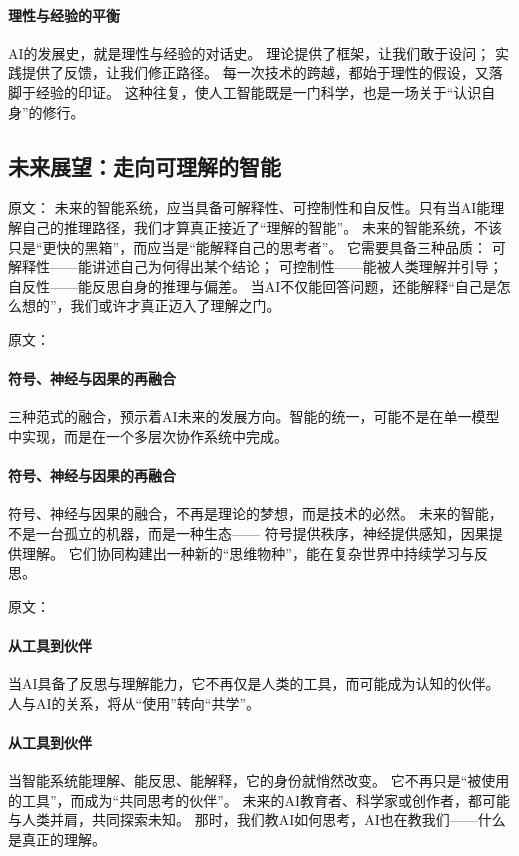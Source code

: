 \paragraph{理性与经验的平衡}
AI的发展史，就是理性与经验的对话史。  
理论提供了框架，让我们敢于设问；  
实践提供了反馈，让我们修正路径。  
每一次技术的跨越，都始于理性的假设，又落脚于经验的印证。  
这种往复，使人工智能既是一门科学，也是一场关于“认识自身”的修行。



\subsection{未来展望：走向可理解的智能}

原文：
未来的智能系统，应当具备可解释性、可控制性和自反性。只有当AI能理解自己的推理路径，我们才算真正接近了“理解的智能”。
未来的智能系统，不该只是“更快的黑箱”，而应当是“能解释自己的思考者”。  
它需要具备三种品质：  
可解释性——能讲述自己为何得出某个结论；  
可控制性——能被人类理解并引导；  
自反性——能反思自身的推理与偏差。  
当AI不仅能回答问题，还能解释“自己是怎么想的”，我们或许才真正迈入了理解之门。

原文：
\paragraph{符号、神经与因果的再融合}
三种范式的融合，预示着AI未来的发展方向。智能的统一，可能不是在单一模型中实现，而是在一个多层次协作系统中完成。
\paragraph{符号、神经与因果的再融合}
符号、神经与因果的融合，不再是理论的梦想，而是技术的必然。  
未来的智能，不是一台孤立的机器，而是一种生态——  
符号提供秩序，神经提供感知，因果提供理解。  
它们协同构建出一种新的“思维物种”，能在复杂世界中持续学习与反思。

原文：
\paragraph{从工具到伙伴}
当AI具备了反思与理解能力，它不再仅是人类的工具，而可能成为认知的伙伴。人与AI的关系，将从“使用”转向“共学”。
\paragraph{从工具到伙伴}
当智能系统能理解、能反思、能解释，它的身份就悄然改变。  
它不再只是“被使用的工具”，而成为“共同思考的伙伴”。  
未来的AI教育者、科学家或创作者，都可能与人类并肩，共同探索未知。  
那时，我们教AI如何思考，AI也在教我们——什么是真正的理解。



